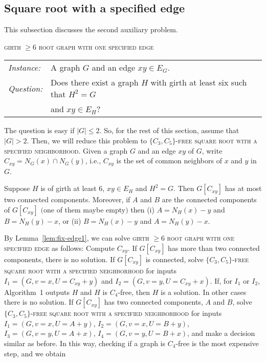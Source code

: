 \documentclass[proceedings]{stacs}
\newlength{\ai}
\begin{document}
\subsection{Square root with a specified edge}\label{fix-edge}
This subsection discusses the second auxiliary problem.

\textsc{girth $\ge 6$ root graph with one specified edge}\\[1ex]
\begin{tabular}{l l}
{\em Instance:}& A graph $G$ and an edge $xy \in E_G$.\\
{\em Question:}& Does there exist a graph $H$ with girth at least six such that $H^2 = G$\\
               & and $xy\in E_H$?\\
\end{tabular}

The question is easy if $|G|\leq 2$.
So, for the rest of this section, assume that $|G| > 2$.
Then, we will reduce this problem to
\textsc{$\{C_3,C_5\}$-free square root with a specified neighborhood}.
Given a graph $G$ and an edge $xy$ of $G$, write $C_{xy} = N_G(x) \cap N_G(y)$,
i.e., $C_{xy}$ is the set of common neighbors of $x$ and $y$ in $G$.

\begin{lemma}\label{lem:fix-edge1}
Suppose $H$ is of girth at least $6$, $xy \in E_H$ and $H^2 = G$. Then
$G[C_{xy}]$ has at most two connected components. Moreover, if $A$ and $B$ are the connected components of $G[C_{xy}]$
$($one of them maybe empty$)$ then (i) $A=N_H(x)-y$ and $B=N_H(y)-x$, or (ii) $B=N_H(x)-y$ and $A=N_H(y)-x$.
\end{lemma}



By Lemma~\ref{lem:fix-edge1}, we can solve \textsc{girth $\ge 6$ root graph with one specified edge}
as follows: Compute $C_{xy}$. If $G[C_{xy}]$ has more than two connected components, there is no solution.
If $G[C_{xy}]$ is connected, solve
\textsc{$\{C_3,C_5\}$-free square root with a specified neighborhood} for inputs $I_1=(G, v=x,
U=C_{xy}+y)$ and $I_2=(G, v=y, U=C_{xy}+x)$. If, for $I_1$ or $I_2$, Algorithm~1 outputs $H$
and $H$ is $C_4$-free, then $H$ is a solution. In other cases there is no solution. If $G[C_{xy}]$
has two connected components, $A$ and $B$, solve
\textsc{$\{C_3,C_5\}$-free square root with a specified neighborhood} for inputs $I_1=(G, v=x,
U=A+y)$, $I_2=(G, v=x, U=B+y)$, $I_3=(G, v=y, U=A+x)$, $I_4=(G, v=y, U=B+x)$, and make a decision
similar as before. In this way, checking if a graph is $C_4$-free is the most expensive step,
and we obtain
\end{document}
